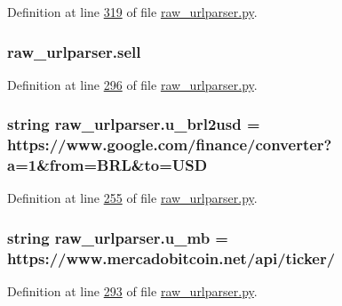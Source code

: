 Definition at line \hyperlink{raw__urlparser_8py_source_l00319}{319} of file \hyperlink{raw__urlparser_8py_source}{raw\+\_\+urlparser.\+py}.

\subsubsection[{\texorpdfstring{sell}{sell}}]{\setlength{\rightskip}{0pt plus 5cm}raw\+\_\+urlparser.\+sell}\hypertarget{namespaceraw__urlparser_a9f1ba2a5cd520bb41ac4bee751047679}{}\label{namespaceraw__urlparser_a9f1ba2a5cd520bb41ac4bee751047679}


Definition at line \hyperlink{raw__urlparser_8py_source_l00296}{296} of file \hyperlink{raw__urlparser_8py_source}{raw\+\_\+urlparser.\+py}.

\subsubsection[{\texorpdfstring{u\+\_\+brl2usd}{u_brl2usd}}]{\setlength{\rightskip}{0pt plus 5cm}string raw\+\_\+urlparser.\+u\+\_\+brl2usd = \textquotesingle{}https\+://www.\+google.\+com/finance/converter?a=1\&from=B\+RL\&to=U\+SD\textquotesingle{}}\hypertarget{namespaceraw__urlparser_a876711ddd7ebb3991a35cc1768d1d22c}{}\label{namespaceraw__urlparser_a876711ddd7ebb3991a35cc1768d1d22c}


Definition at line \hyperlink{raw__urlparser_8py_source_l00255}{255} of file \hyperlink{raw__urlparser_8py_source}{raw\+\_\+urlparser.\+py}.

\subsubsection[{\texorpdfstring{u\+\_\+mb}{u_mb}}]{\setlength{\rightskip}{0pt plus 5cm}string raw\+\_\+urlparser.\+u\+\_\+mb = \textquotesingle{}https\+://www.\+mercadobitcoin.\+net/api/ticker/\textquotesingle{}}\hypertarget{namespaceraw__urlparser_a9a840f174b92a24c415b88c87e84b73d}{}\label{namespaceraw__urlparser_a9a840f174b92a24c415b88c87e84b73d}


Definition at line \hyperlink{raw__urlparser_8py_source_l00293}{293} of file \hyperlink{raw__urlparser_8py_source}{raw\+\_\+urlparser.\+py}.

